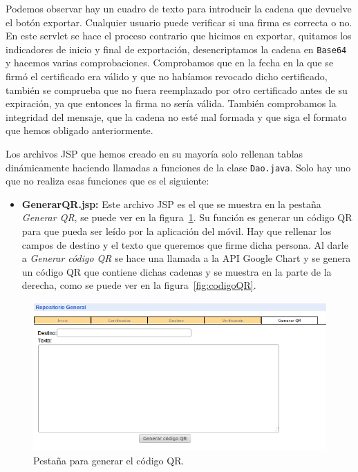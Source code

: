 \begin{itemize}

Podemos observar hay un cuadro de texto para introducir la cadena que devuelve el botón exportar. Cualquier usuario puede verificar si una firma es correcta o no. En este servlet se hace el proceso contrario que hicimos en exportar, quitamos los indicadores de inicio y final de exportación, desencriptamos la cadena en \lstinline{Base64} y hacemos varias comprobaciones. Comprobamos que en la fecha en la que se firmó el certificado era válido y que no habíamos revocado dicho certificado, también se comprueba que no fuera reemplazado por otro certificado antes de su expiración, ya que entonces la firma no sería válida. También comprobamos la integridad del mensaje, que la cadena no esté mal formada y que siga el formato que hemos obligado anteriormente.

\end{itemize}

Los archivos JSP que hemos creado en su mayoría solo rellenan tablas dinámicamente haciendo llamadas a funciones de la clase \lstinline{Dao.java}. Solo hay uno que no realiza esas funciones que es el siguiente:

\begin{itemize}

\item \textbf{GenerarQR.jsp:} Este archivo JSP es el que se muestra en la pestaña \textit{Generar QR}, se puede ver en la figura~\ref{fig:pestanhaQR}. Su función es generar un código QR para que pueda ser leído por la aplicación del móvil. Hay que rellenar los campos de destino y el texto que queremos que firme dicha persona. Al darle a \textit{Generar código QR} se hace una llamada a la API Google Chart y se genera un código QR que contiene dichas cadenas y se muestra en la parte de la derecha, como se puede ver en la figura~\ref{fig:codigoQR}.

\end{itemize}

\begin{figure}[h]
  \centering
    \includegraphics[scale=0.5]{./GoogleAppEngine/imagenes/pestanhaQR.png}
  \caption{Pestaña para generar el código QR.}
  \label{fig:pestanhaQR}
\end{figure}

